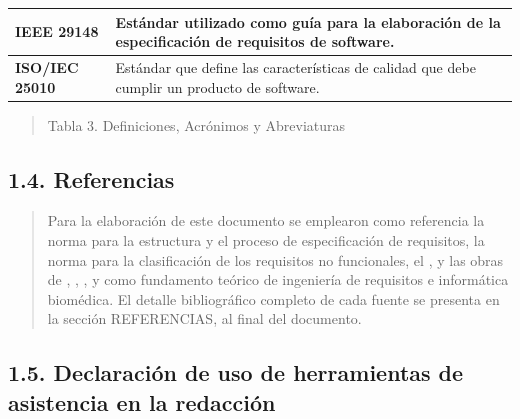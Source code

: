 \documentclass[
]{article}
\newcounter{none} %
\begin{document}
{\def\LTcaptype{none} %
\begin{longtable}[]{|
  >{\raggedright\arraybackslash}p{}|
  >{\raggedright\arraybackslash}p{}|}
\hline
\begin{minipage}[b]{\linewidth}\raggedright
\textbf{IEEE 29148}
\end{minipage} & \begin{minipage}[b]{\linewidth}\raggedright
Estándar utilizado como guía para la elaboración de la especificación de
requisitos de software.
\end{minipage} \\
\hline
\endhead
\hline
\endlastfoot
\textbf{ISO/IEC} \textbf{25010} & Estándar que define las características de calidad que
debe cumplir un producto de software. \\
\hline
\end{longtable}
}

\begin{quote}
\protect{}\label{_bookmark8}{}Tabla 3. Definiciones,
Acrónimos y Abreviaturas
\end{quote}

\subsection{1.4. Referencias}\label{referencias}

\begin{quote}
Para la elaboración de este documento se emplearon como referencia la
norma \cite{iso29148} para la estructura y el proceso de
especificación de requisitos, la norma \cite{iso25010} para la
clasificación de los requisitos no funcionales, el
\cite{swebok4}, y las obras de \cite{pohl2010},
\cite{sommerville2016}, \cite{shortliffe2014}, \cite{topol2019} y
\cite{haux2018} como fundamento teórico de ingeniería de requisitos e
informática biomédica. El detalle bibliográfico completo de cada
fuente se presenta en la sección REFERENCIAS, al final del documento.
\end{quote}

\subsection{1.5. Declaración de uso de herramientas de asistencia en la
redacción}\label{declaracion-uso-ia}
\end{document}
